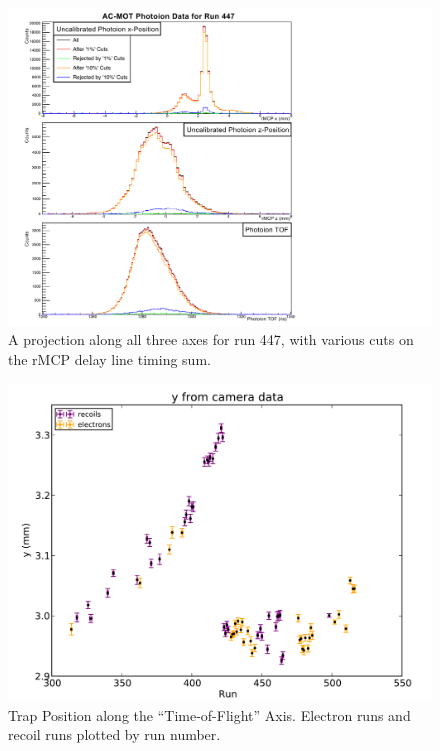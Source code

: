 \begin{figure}[h!!t]
	\centering
	\includegraphics[width=.999\linewidth]
	{Figures/rMCP_xyz_comparecuts447.pdf}
	\caption[A projection along all three axes for run 447, with various cuts on the rMCP delay line timing sum.]{A projection along all three axes for run 447, with various cuts on the rMCP delay line timing sum.}	
\end{figure}


\begin{figure}[h!!t]
	\centering
	\includegraphics[width=.999\linewidth]
	{Figures/y_from_camera_electron_recoil.pdf}
	\caption[Trap Position along TOF Axis]{Trap Position along the ``Time-of-Flight'' Axis.  Electron runs and recoil runs plotted by run number.  }	
	\label{fig:camera_electron_recoil}
\end{figure}

